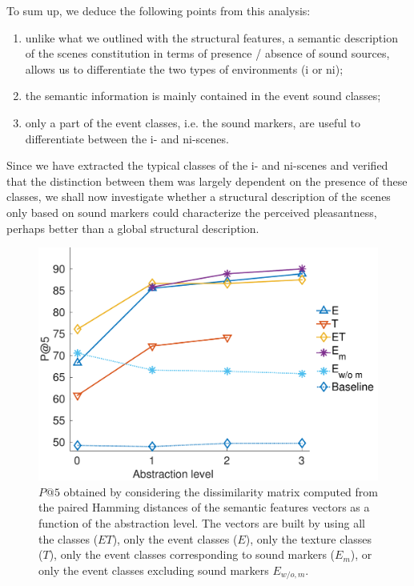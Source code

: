 \documentclass[preprint,12pt]{elsarticle}
\newcommand{\myfloatalign}{\centering}
\begin{document}
To sum up, we deduce the following points from this analysis:

\begin{enumerate}
\item unlike what we outlined with the structural features, a semantic description of the scenes constitution in terms of presence / absence of sound sources, allows us to differentiate the two types of environments (i or ni);
\item the semantic information is mainly contained in the event sound classes;
\item only a part of the event classes, i.e. the sound markers, are useful to differentiate between the i- and ni-scenes.
\end{enumerate}

Since we have extracted the typical classes of the i- and ni-scenes and verified that the distinction between them was largely dependent on the presence of these classes, we shall now investigate whether a structural description of the scenes only based on sound markers could characterize the perceived pleasantness, perhaps better than a global structural description.

\begin{figure}[t]
        \myfloatalign
        \includegraphics[width=\linewidth]{gfx/ch_5/pa5_1_en}
       \caption{$P@5$ obtained by considering the dissimilarity matrix computed from the paired Hamming distances of the semantic features vectors as a function of the abstraction level. The vectors are built by using all the classes ($ET$), only the event classes ($E$), only the texture classes ($T$), only the event classes corresponding to sound markers ($E_m$), or only the event classes excluding sound markers $E_{w/o,m}$.}\label{fig:pa5}
\end{figure}
\end{document}
